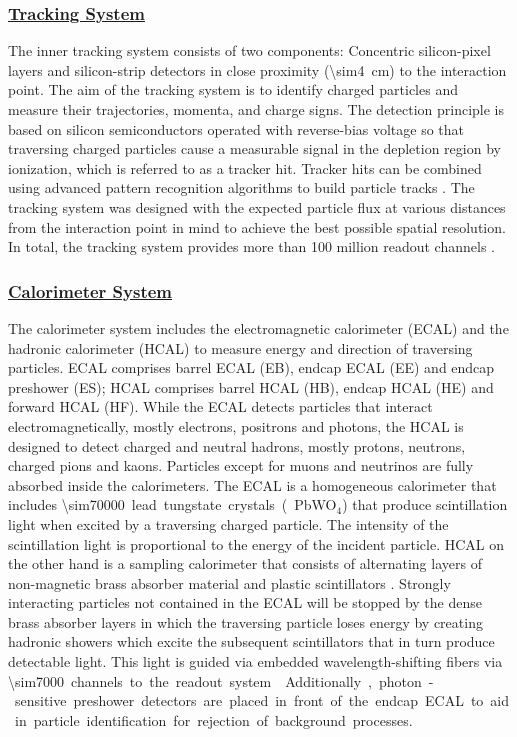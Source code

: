 \documentclass[../../main.tex]{subfiles}
\begin{document}
\subsubsection*{\underline{Tracking System}}
The inner tracking system consists of two components: Concentric silicon-pixel layers and silicon-strip detectors in close proximity (\SI{\sim4}{cm}) to the interaction point. The aim of the tracking system is to identify charged particles and measure their trajectories, momenta, and charge signs. The detection principle is based on silicon semiconductors operated with reverse-bias voltage so that traversing charged particles cause a measurable signal in the depletion region by ionization, which is referred to as a tracker hit. Tracker hits can be combined using advanced pattern recognition algorithms to build particle tracks \cite{speer06}. The tracking system was designed with the expected particle flux at various distances from the interaction point in mind to achieve the best possible spatial resolution. In total, the tracking system provides more than 100 million readout channels \cite{Collaboration_2008, sonneveld18}.

\subsubsection*{\underline{Calorimeter System}}
The calorimeter system includes the electromagnetic calorimeter (ECAL) and the hadronic calorimeter (HCAL) to measure energy and direction of traversing particles. ECAL comprises barrel ECAL (EB), endcap ECAL (EE) and endcap preshower (ES); HCAL comprises barrel HCAL (HB), endcap HCAL (HE) and forward HCAL (HF). While the ECAL detects particles that interact electromagnetically, mostly electrons, positrons and photons, the HCAL is designed to detect charged and neutral hadrons, mostly protons, neutrons, charged pions and kaons. Particles except for muons and neutrinos are fully absorbed inside the calorimeters. The ECAL is a homogeneous calorimeter that includes \SI{\sim70000} lead tungstate crystals (PbWO$_4$) that produce scintillation light when excited by a traversing charged particle. The intensity of the scintillation light is proportional to the energy of the incident particle. HCAL on the other hand is a sampling calorimeter that consists of alternating layers of non-magnetic brass absorber material and plastic scintillators \cite{Collaboration_2008,Bayatian:922757}. Strongly interacting particles not contained in the ECAL will be stopped by the dense brass absorber layers in which the traversing particle loses energy by creating hadronic showers which excite the subsequent scintillators that in turn produce detectable light. This light is guided via embedded wavelength-shifting fibers via \SI{\sim7000} channels to the readout system \cite{CMS:2010kua}. Additionally, photon-sensitive preshower detectors are placed in front of the endcap ECAL to aid in particle identification for rejection of background processes.
\end{document}

